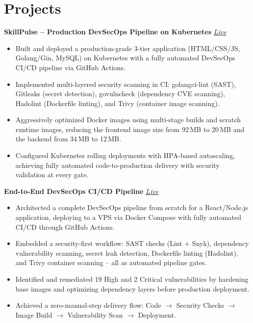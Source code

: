 \documentclass[11pt, letterpaper]{article}
\begin{document}
\section*{Projects}

\vspace{2pt}
\textbf{SkillPulse -- Production DevSecOps Pipeline on Kubernetes} \hfill \href{https://devops.shivanggupta.in:8443/}{\textit{Live}}
\begin{itemize}
    \item Built and deployed a production-grade 3-tier application (HTML/CSS/JS, Golang/Gin, MySQL) on Kubernetes with a fully automated DevSecOps CI/CD pipeline via GitHub Actions.
    \item Implemented multi-layered security scanning in CI: golangci-lint (SAST), Gitleaks (secret detection), govulncheck (dependency CVE scanning), Hadolint (Dockerfile linting), and Trivy (container image scanning).
    \item Aggressively optimized Docker images using multi-stage builds and scratch runtime images, reducing the frontend image size from 92\,MB to 20\,MB and the backend from 34\,MB to 12\,MB.
    \item Configured Kubernetes rolling deployments with HPA-based autoscaling, achieving fully automated code-to-production delivery with security validation at every gate.
\end{itemize}

\vspace{4pt}
\textbf{End-to-End DevSecOps CI/CD Pipeline} \hfill \href{https://devops.shivanggupta.in:8443/}{\textit{Live}}
\begin{itemize}
    \item Architected a complete DevSecOps pipeline from scratch for a React/Node.js application, deploying to a VPS via Docker Compose with fully automated CI/CD through GitHub Actions.
    \item Embedded a security-first workflow: SAST checks (Lint + Snyk), dependency vulnerability scanning, secret leak detection, Dockerfile linting (Hadolint), and Trivy container scanning -- all as automated pipeline gates.
    \item Identified and remediated 19 High and 2 Critical vulnerabilities by hardening base images and optimizing dependency layers before production deployment.
    \item Achieved a zero-manual-step delivery flow: Code $\rightarrow$ Security Checks $\rightarrow$ Image Build $\rightarrow$ Vulnerability Scan $\rightarrow$ Deployment.
\end{itemize}
\end{document}
